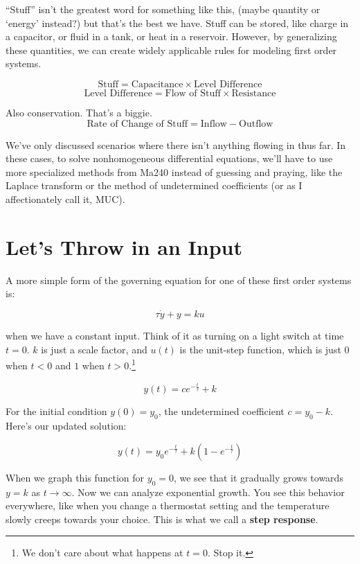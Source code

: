 \documentclass{report}
\begin{document}
\begin{onehalfspacing}
\begin{flushleft}
\medskip

``Stuff'' isn't the greatest word for something like this, (maybe quantity  or `energy' instead?) but that's the best we have. Stuff can be stored, like charge in a capacitor, or fluid in a tank, or heat in a reservoir. However, by generalizing these quantities, we can create widely applicable rules for modeling first order systems.

\[\text{Stuff} = \text{Capacitance} \times \text{Level Difference}\]
\[\text{Level Difference} = \text{Flow of Stuff} \times \text{Resistance}\]

Also conservation. That's a biggie.
\[\text{Rate of Change of Stuff} = \text{Inflow} - \text{Outflow}\]

We've only discussed scenarios where there isn't anything flowing in thus far. In these cases, to solve nonhomogeneous differential equations, we'll have to use more specialized methods from Ma240 instead of guessing and praying, like the Laplace transform or the method of undetermined coefficients (or as I affectionately call it, MUC).

\section{Let's Throw in an Input}

A more simple form of the governing equation for one of these first order systems is:

\vspace{-0.1in}
\[\tau \dot{y} + y = ku\]

when we have a constant input. Think of it as turning on a light switch at time \(t=0\). \(k\) is just a scale factor, and \(u(t)\) is the unit-step function, which is just \(0\) when \(t<0\) and \(1\) when \(t>0\).\footnote{We don't care about what happens at \(t=0\). Stop it.}

\vspace{-0.1in}
\[y(t) = ce^{-\frac{t}{\tau}} + k\]

For the initial condition \(y(0) = y_0\), the undetermined coefficient \(c=y_0 - k\). Here's our updated solution:

\vspace{-0.1in}
\[y(t) = y_0 e^{-\frac{t}{\tau}} + k(1-e^{-\frac{t}{\tau}})\]

When we graph this function for \(y_0 = 0\), we see that it gradually grows towards \(y=k\) as \(t\to\infty\). Now we can analyze exponential growth. You see this behavior everywhere, like when you change a thermostat setting and the temperature slowly creeps towards your choice. This is what we call a \textbf{step response}.


\end{flushleft}
\end{onehalfspacing}
\end{document}
